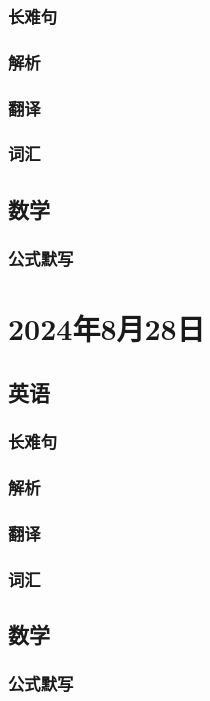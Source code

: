\documentclass[UTF8]{ctexart}
\begin{document}
\subsubsection{长难句}
\subsubsection{解析}
\subsubsection{翻译}
\subsubsection{词汇}
\subsection{数学}
\subsubsection{公式默写}
\begin{multicols}{2}
\end{multicols}
\section{2024年8月28日}
\subsection{英语}
\subsubsection{长难句}
\subsubsection{解析}
\subsubsection{翻译}
\subsubsection{词汇}
\subsection{数学}
\subsubsection{公式默写}
\begin{multicols}{2}
\end{multicols}
\end{document}
